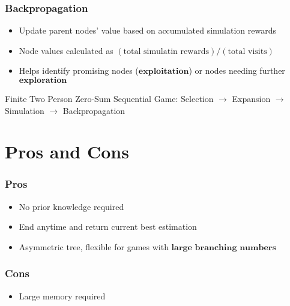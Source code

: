 \documentclass[openany]{memoir}
\begin{document}
\subsubsection{Backpropagation}
\begin{itemize}
		\item Update parent nodes' value based on accumulated simulation rewards
		\item Node values calculated as $(\text{total simulatin rewards}) / (\text{total visits})$ 
		\item Helps identify promising nodes ($\textbf{exploitation}$) or nodes needing further $\textbf{exploration}$
\end{itemize}
\begin{remark}{}{}
	Finite Two Person Zero-Sum Sequential Game: Selection $\to$ Expansion  $\to$ Simulation $\to$ Backpropagation
\end{remark}
\section{Pros and Cons}
\subsubsection{Pros}
\begin{itemize}
		\item No prior knowledge required
		\item End anytime and return current best estimation
		\item Asymmetric tree, flexible for games with $\textbf{large branching numbers}$
\end{itemize}
\subsubsection{Cons}
\begin{itemize}
		\item Large memory required
\end{itemize}
\end{document}
